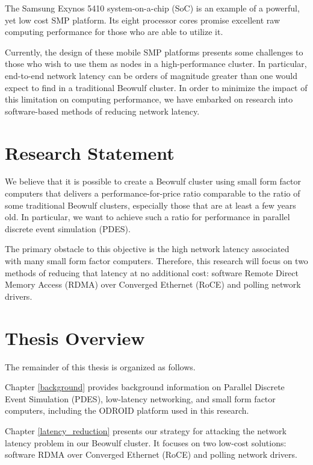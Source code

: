 \documentclass[11pt]{book}
\begin{document}
The Samsung Exynos 5410 system-on-a-chip (SoC) is an example of a powerful, yet
low cost SMP platform. Its eight processor cores promise excellent raw computing
performance for those who are able to utilize it.

Currently, the design of these mobile SMP platforms presents some challenges to
those who wish to use them as nodes in a high-performance cluster. In
particular, end-to-end network latency can be orders of magnitude greater than
one would expect to find in a traditional Beowulf cluster. In order to minimize
the impact of this limitation on computing performance, we have embarked on
research into software-based methods of reducing network latency.

\section{\textbf{Research Statement}}

We believe that it is possible to create a Beowulf cluster using small form
factor computers that delivers a performance-for-price ratio comparable to the
ratio of some traditional Beowulf clusters, especially those that are at least a few
years old. In particular, we want to achieve such a ratio for performance in
parallel discrete event simulation (PDES).

The primary obstacle to this objective is the high network latency associated
with many small form factor computers. Therefore, this research will focus on
two methods of reducing that latency at no additional cost: software Remote
Direct Memory Access (RDMA) over Converged Ethernet (RoCE) and polling network
drivers.

\section{\textbf{Thesis Overview}}

The remainder of this thesis is organized as follows.

Chapter \ref{background} provides background information on Parallel Discrete
Event Simulation (PDES), low-latency networking, and small form factor
computers, including the ODROID platform used in this research.

Chapter \ref{latency_reduction} presents our strategy for attacking the network
latency problem in our Beowulf cluster. It focuses on two low-cost solutions:
software RDMA over Converged Ethernet (RoCE) and polling network drivers.
\end{document}
